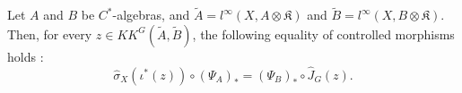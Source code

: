 

\begin{lem} Let $A$ and $B$ be $C^*$-algebras, and $\tilde A = l^\infty(X,A\otimes \mathfrak K)$ and $\tilde B = l^\infty(X,B\otimes \mathfrak K)$. Then, for every $z\in KK^G(\tilde A,\tilde B)$, the following equality of controlled morphisms holds :
\[\hat\sigma_X(\iota^*(z))\circ (\Psi_A)_* = (\Psi_B)_*\circ \hat J_G(z).\]  
\end{lem}

